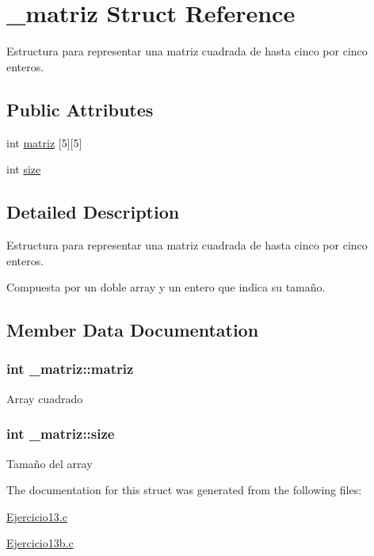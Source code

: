 \hypertarget{struct__matriz}{}\section{\+\_\+matriz Struct Reference}
\label{struct__matriz}


Estructura para representar una matriz cuadrada de hasta cinco por cinco enteros.  


\subsection*{Public Attributes}
\begin{DoxyCompactItemize}
\item 
int \hyperlink{struct__matriz_a1b68fbc3d00d7a4321acbd76345e3cc5}{matriz} \mbox{[}5\mbox{]}\mbox{[}5\mbox{]}
\item 
int \hyperlink{struct__matriz_a2cb133713d95ad62192c49cab293558b}{size}
\end{DoxyCompactItemize}


\subsection{Detailed Description}
Estructura para representar una matriz cuadrada de hasta cinco por cinco enteros. 

Compuesta por un doble array y un entero que indica su tamaño. 

\subsection{Member Data Documentation}
\subsubsection[{\texorpdfstring{matriz}{matriz}}]{\setlength{\rightskip}{0pt plus 5cm}int \+\_\+matriz\+::matriz}\hypertarget{struct__matriz_a1b68fbc3d00d7a4321acbd76345e3cc5}{}\label{struct__matriz_a1b68fbc3d00d7a4321acbd76345e3cc5}
Array cuadrado 
\subsubsection[{\texorpdfstring{size}{size}}]{\setlength{\rightskip}{0pt plus 5cm}int \+\_\+matriz\+::size}\hypertarget{struct__matriz_a2cb133713d95ad62192c49cab293558b}{}\label{struct__matriz_a2cb133713d95ad62192c49cab293558b}
Tamaño del array 

The documentation for this struct was generated from the following files\+:\begin{DoxyCompactItemize}
\item 
\hyperlink{Ejercicio13_8c}{Ejercicio13.\+c}\item 
\hyperlink{Ejercicio13b_8c}{Ejercicio13b.\+c}\end{DoxyCompactItemize}
